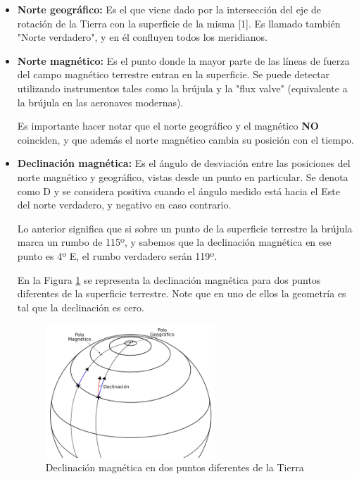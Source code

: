 \documentclass[a4paper,12pt,twoside]{article}
\begin{document}
\begin{itemize}
\item\textbf{ Norte geográfico: }Es el que viene dado por la intersección del eje de rotación de la Tierra con la superficie de la misma [1]. Es llamado también "Norte verdadero", y en él confluyen todos los meridianos.

\item \textbf{Norte magnético:} Es el punto donde la mayor parte de las líneas de fuerza del campo magnético terrestre entran en la superficie. Se puede detectar utilizando instrumentos tales como la brújula y la "flux valve" (equivalente a la brújula en las aeronaves modernas).

Es importante hacer notar que el norte geográfico y el magnético \textbf{NO} coinciden, y que además el norte magnético cambia su posición con el tiempo.

\item \textbf{Declinación magnética:} Es el ángulo de desviación entre las posiciones del norte magnético y geográfico, vistas desde un punto en particular. Se denota como D y se considera positiva cuando el ángulo medido está hacia el Este del norte verdadero, y negativo en caso contrario. 

Lo anterior significa que si sobre un punto de la superficie terrestre la brújula marca un rumbo de 115º, y sabemos que la declinación magnética en ese punto es 4º E, el rumbo verdadero serán 119º. 

En la Figura \ref{fig:declinacion-magnetica} se representa la declinación magnética para dos puntos diferentes de la superficie terrestre. Note que en uno de ellos la geometría es tal que la declinación es cero. 

\begin{figure}[!h]
    \centering
\includegraphics[keepaspectratio,width=0.6\textwidth]{./Imagenes/declinacion-magnetica.png}
\caption{Declinaci\'on magn\'etica en dos puntos diferentes de la Tierra \cite{Salazar_nav_aerea}}
\label{fig:declinacion-magnetica}
\end{figure}


\end{itemize}
\end{document}
